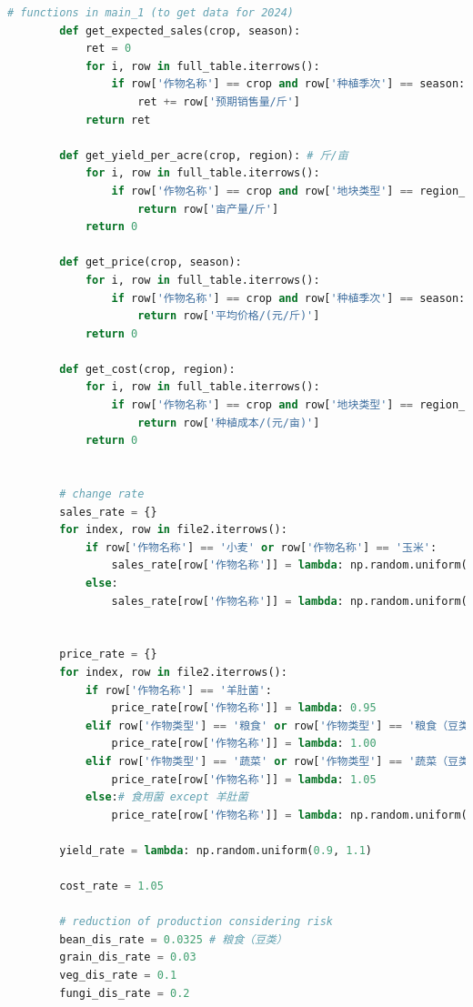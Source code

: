 \documentclass{cumcmthesis}
\begin{document}
\begin{appendices}
\begin{lstlisting}[language=python]
        # functions in main_1 (to get data for 2024)
        def get_expected_sales(crop, season):
            ret = 0
            for i, row in full_table.iterrows():
                if row['作物名称'] == crop and row['种植季次'] == season:
                    ret += row['预期销售量/斤']
            return ret
    
        def get_yield_per_acre(crop, region): # 斤/亩
            for i, row in full_table.iterrows():
                if row['作物名称'] == crop and row['地块类型'] == region_to_type[region]:
                    return row['亩产量/斤']
            return 0
        
        def get_price(crop, season):
            for i, row in full_table.iterrows():
                if row['作物名称'] == crop and row['种植季次'] == season:
                    return row['平均价格/(元/斤)']
            return 0
    
        def get_cost(crop, region):
            for i, row in full_table.iterrows():
                if row['作物名称'] == crop and row['地块类型'] == region_to_type[region]:
                    return row['种植成本/(元/亩)']
            return 0
        
    
        # change rate
        sales_rate = {}
        for index, row in file2.iterrows():
            if row['作物名称'] == '小麦' or row['作物名称'] == '玉米':
                sales_rate[row['作物名称']] = lambda: np.random.uniform(1.05, 1.10)
            else:
                sales_rate[row['作物名称']] = lambda: np.random.uniform(0.95, 1.05) #! TODO: potential misunderstanding
    
        
        price_rate = {}
        for index, row in file2.iterrows():
            if row['作物名称'] == '羊肚菌':
                price_rate[row['作物名称']] = lambda: 0.95
            elif row['作物类型'] == '粮食' or row['作物类型'] == '粮食（豆类）':
                price_rate[row['作物名称']] = lambda: 1.00
            elif row['作物类型'] == '蔬菜' or row['作物类型'] == '蔬菜（豆类）':
                price_rate[row['作物名称']] = lambda: 1.05
            else:# 食用菌 except 羊肚菌
                price_rate[row['作物名称']] = lambda: np.random.uniform(0.95, 0.99)
        
        yield_rate = lambda: np.random.uniform(0.9, 1.1)
    
        cost_rate = 1.05
    
        # reduction of production considering risk
        bean_dis_rate = 0.0325 # 粮食（豆类）
        grain_dis_rate = 0.03
        veg_dis_rate = 0.1
        fungi_dis_rate = 0.2
    

\end{lstlisting}
\end{appendices}
\end{document}
